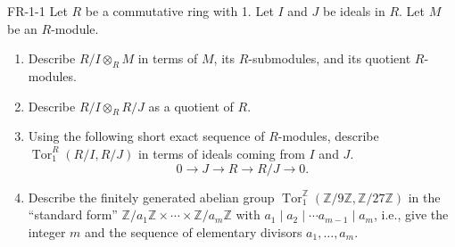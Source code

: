 \documentclass{article}
\begin{document}
	\begin{prb}{FR-1-1}
		Let $R$ be a commutative ring with 1. Let $I$ and $J$ be ideals in $R$. Let $M$ be an $R$-module. \vspace{-0.25cm} 
		\begin{enumerate}[itemsep =-2pt,label = (\alph{*})]
			\item Describe $R/I \otimes_{R} M$ in terms of $M$, its $R$-submodules, and its quotient $R$-modules. 
			\item Describe $R/I \otimes_{R} R/J$ as a quotient of $R$. 
			\item Using the following short exact sequence of $R$-modules, describe $\operatorname{Tor}^{R}_{1}(R/I, R/J)$ in terms of ideals coming from $I$ and $J$. 
			\begin{equation*}
				0 \longrightarrow J \longrightarrow R \longrightarrow R/J \longrightarrow 0. 
			\end{equation*}
			\item Describe the finitely generated abelian group $\operatorname{Tor}_{1}^{\mathbb{Z}}(\mathbb{Z}/9\mathbb{Z}, \mathbb{Z}/27\mathbb{Z})$ in the ``standard form'' $\mathbb{Z}/a_{1}\mathbb{Z} \times \dotsm \times \mathbb{Z}/a_{m}\mathbb{Z}$ with $a_{1} \mid a_{2} \mid \dotsm a_{m- 1} \mid a_{m}$, i.e., give the integer $m$ and the sequence of elementary divisors $a_{1}, \ldots, a_{m}$. 
		\end{enumerate}
	\end{prb}
\end{document}
